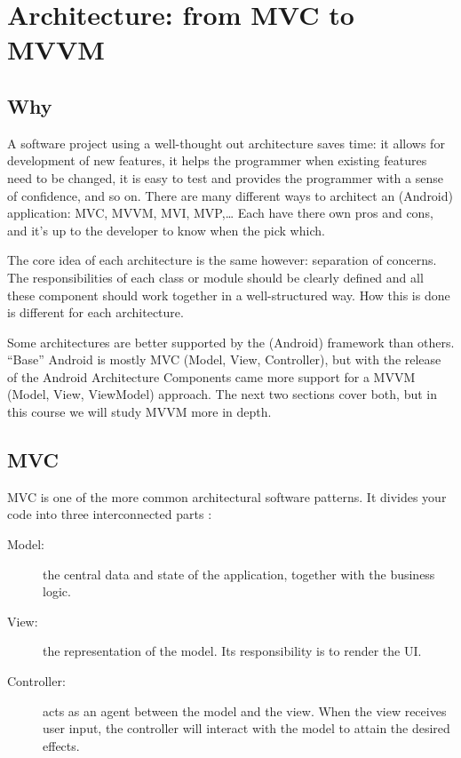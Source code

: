

\chapter{Architecture: from MVC to MVVM}

\section{Why}
A software project using a well-thought out architecture saves time: it allows for development of new features, it helps the programmer when existing features need to be changed, it is easy to test and provides the programmer with a sense of confidence, and so on. 
There are many different ways to architect an (Android) application: MVC, MVVM, MVI, MVP,\ldots 
Each have there own pros and cons, and it's up to the developer to know when the pick which.

The core idea of each architecture is the same however: separation of concerns.
The responsibilities of each class or module should be clearly defined and all these component should work together in a well-structured way. 
How this is done is different for each architecture. 

Some architectures are better supported by the (Android) framework than others. 
``Base'' Android is mostly MVC (Model, View, Controller), but with the release of the Android Architecture Components came more support for a MVVM (Model, View, ViewModel) approach.
The next two sections cover both, but in this course we will study MVVM more in depth. 



\section{MVC}
MVC is one of the more common architectural software patterns.
It divides your code into three interconnected parts \cite{mvc-mvp-mvv-on-android}:

\begin{description}
	\item[Model:] the central data and state of the application, together with the business logic.
	\item[View:] the representation of the model. Its responsibility is to render the UI.
	\item[Controller:] acts as an agent between the model and the view. 
		When the view receives user input, the controller will interact with the model to attain the desired effects.
\end{description}

